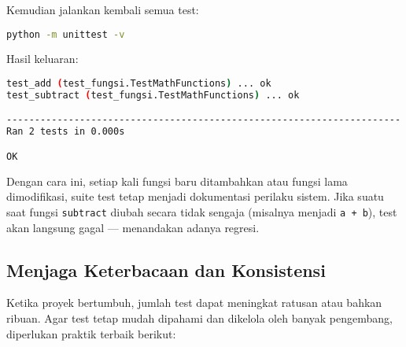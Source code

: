 Kemudian jalankan kembali semua test:

\begin{lstlisting}[language=bash]
python -m unittest -v
\end{lstlisting}

Hasil keluaran:

\begin{lstlisting}[language=bash]
test_add (test_fungsi.TestMathFunctions) ... ok
test_subtract (test_fungsi.TestMathFunctions) ... ok

----------------------------------------------------------------------
Ran 2 tests in 0.000s

OK
\end{lstlisting}

Dengan cara ini, setiap kali fungsi baru ditambahkan atau fungsi lama dimodifikasi, suite test tetap menjadi dokumentasi perilaku sistem.  
Jika suatu saat fungsi \texttt{subtract} diubah secara tidak sengaja (misalnya menjadi \texttt{a + b}), test akan langsung gagal — menandakan adanya regresi.

\subsection{Menjaga Keterbacaan dan Konsistensi}

Ketika proyek bertumbuh, jumlah test dapat meningkat ratusan atau bahkan ribuan.  
Agar test tetap mudah dipahami dan dikelola oleh banyak pengembang, diperlukan praktik terbaik berikut:

